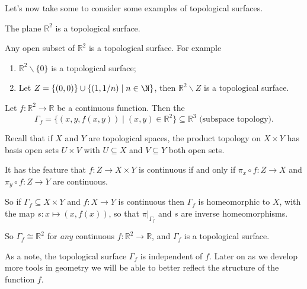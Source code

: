 \documentclass[a4paper]{scrartcl}
\begin{document}
Let's now take some to consider some examples of topological surfaces.

\begin{example}[$\mathbb{R}^2$]
    The plane $\mathbb{R}^2$ is a topological surface.
\end{example}

\begin{example}
    Any open subset of $\mathbb{R}^2$ is a topological surface. For example
    \begin{enumerate}[label=(\roman*)]
        \item $\mathbb{R}^2 \backslash \{0\}$ is a topological surface;
        \item Let $Z = \{(0, 0) \} \cup \{(1, 1/n) \mid n \in \N\}$, then $\mathbb{R}^2 \backslash Z$ is a topological surface.
    \end{enumerate}
\end{example}

\begin{example}[Graphs]
    Let $f: \mathbb{R}^2 \rightarrow \mathbb{R}$ be a continuous function. Then the  
    $$\Gamma_f = \{(x, y, f(x, y)) \mid (x, y) \in \mathbb{R}^2\} \subseteq \mathbb{R}^3 \text{ (subspace topology)}.$$
    
    Recall that if $X$ and $Y$ are topological spaces, the product topology on $X \times Y$ has basis open sets $U \times V$ with $U \subseteq X$ and $V \subseteq Y$ both open sets.

    It has the feature that $f: Z \rightarrow X \times Y$ is continuous if and only if $\pi_x \circ f: Z \rightarrow X$ and $\pi_y \circ f: Z \rightarrow Y$ are continuous.

    So if $\Gamma_f \subseteq X \times Y$ and $f: X \rightarrow Y$ is continuous then $\Gamma_f$ is homeomorphic to $X$, with the map $s: x \mapsto (x, f(x))$, so that $\left.\pi\right|_{\Gamma_f}$ and $s$ are inverse homeomorphisms.

    So $\Gamma_f \cong \mathbb{R}^2$ for \emph{any} continuous $f: \mathbb{R}^2 \rightarrow \mathbb{R}$, and $\Gamma_f$ is a topological surface.
\end{example}

As a note, the topological surface $\Gamma_f$ is independent of $f$. Later on as we develop more tools in geometry we will be able to better reflect the structure of the function $f$. 
\end{document}
